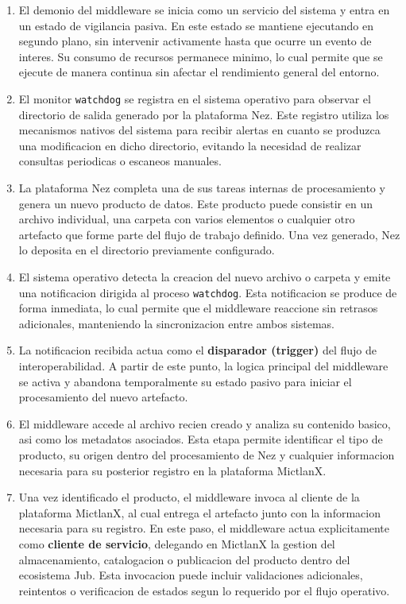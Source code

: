 \begin{enumerate}
	\item El demonio del middleware se inicia como un servicio del sistema y entra en un estado de vigilancia pasiva. En este estado se mantiene ejecutando en segundo plano, sin intervenir activamente hasta que ocurre un evento de interes. Su consumo de recursos permanece minimo, lo cual permite que se ejecute de manera continua sin afectar el rendimiento general del entorno.
	
	\item El monitor \texttt{watchdog} se registra en el sistema operativo para observar el directorio de salida generado por la plataforma Nez. Este registro utiliza los mecanismos nativos del sistema para recibir alertas en cuanto se produzca una modificacion en dicho directorio, evitando la necesidad de realizar consultas periodicas o escaneos manuales.
	
	\item La plataforma Nez completa una de sus tareas internas de procesamiento y genera un nuevo producto de datos. Este producto puede consistir en un archivo individual, una carpeta con varios elementos o cualquier otro artefacto que forme parte del flujo de trabajo definido. Una vez generado, Nez lo deposita en el directorio previamente configurado.
	
	\item El sistema operativo detecta la creacion del nuevo archivo o carpeta y emite una notificacion dirigida al proceso \texttt{watchdog}. Esta notificacion se produce de forma inmediata, lo cual permite que el middleware reaccione sin retrasos adicionales, manteniendo la sincronizacion entre ambos sistemas.
	
	\item La notificacion recibida actua como el \textbf{disparador (trigger)} del flujo de interoperabilidad. A partir de este punto, la logica principal del middleware se activa y abandona temporalmente su estado pasivo para iniciar el procesamiento del nuevo artefacto.
	
	\item El middleware accede al archivo recien creado y analiza su contenido basico, asi como los metadatos asociados. Esta etapa permite identificar el tipo de producto, su origen dentro del procesamiento de Nez y cualquier informacion necesaria para su posterior registro en la plataforma MictlanX.
	
	\item Una vez identificado el producto, el middleware invoca al cliente de la plataforma MictlanX, al cual entrega el artefacto junto con la informacion necesaria para su registro. En este paso, el middleware actua explicitamente como \textbf{cliente de servicio}, delegando en MictlanX la gestion del almacenamiento, catalogacion o publicacion del producto dentro del ecosistema Jub. Esta invocacion puede incluir validaciones adicionales, reintentos o verificacion de estados segun lo requerido por el flujo operativo.
	

\end{enumerate}
